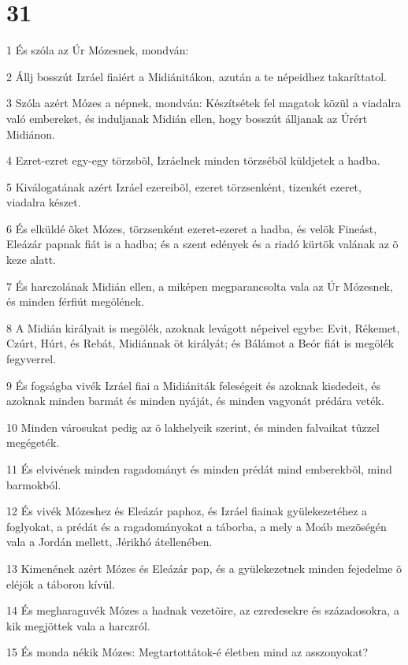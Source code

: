 \chapter{31}

\par 1 És szóla az Úr Mózesnek, mondván:
\par 2 Állj bosszút Izráel fiaiért a Midiánitákon, azután a te népeidhez takaríttatol.
\par 3 Szóla azért Mózes a népnek, mondván: Készítsétek fel magatok közül a viadalra való embereket, és induljanak Midián ellen, hogy bosszút álljanak az Úrért Midiánon.
\par 4 Ezret-ezret egy-egy törzsbõl, Izráelnek minden törzsébõl küldjetek a hadba.
\par 5 Kiválogatának azért Izráel ezereibõl, ezeret törzsenként, tizenkét ezeret, viadalra készet.
\par 6 És elküldé õket Mózes, törzsenként ezeret-ezeret a hadba, és velök Fineást, Eleázár papnak fiát is a hadba; és a szent edények és a riadó kürtök valának az õ keze alatt.
\par 7 És harczolának Midián ellen, a miképen megparancsolta vala az Úr Mózesnek, és minden férfiút megölének.
\par 8 A Midián királyait is megölék, azoknak levágott népeivel egybe: Evit, Rékemet, Czúrt, Húrt, és Rebát, Midiánnak öt királyát; és Bálámot a Beór fiát is megölék fegyverrel.
\par 9 És fogságba vivék Izráel fiai a Midiániták feleségeit és azoknak kisdedeit, és azoknak minden barmát és minden nyáját, és minden vagyonát prédára veték.
\par 10 Minden városukat pedig az õ lakhelyeik szerint, és minden falvaikat tûzzel megégeték.
\par 11 És elvivének minden ragadományt és minden prédát mind emberekbõl, mind barmokból.
\par 12 És vivék Mózeshez és Eleázár paphoz, és Izráel fiainak gyülekezetéhez a foglyokat, a prédát és a ragadományokat a táborba, a mely a Moáb mezõségén vala a Jordán mellett, Jérikhó átellenében.
\par 13 Kimenének azért Mózes és Eleázár pap, és a gyülekezetnek minden fejedelme õ eléjök a táboron kívül.
\par 14 És megharaguvék Mózes a hadnak vezetõire, az ezredesekre és századosokra, a kik megjöttek vala a harczról.
\par 15 És monda nékik Mózes: Megtartottátok-é életben mind az asszonyokat?
